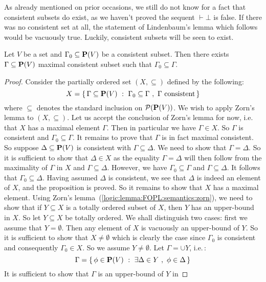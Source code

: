 As already mentioned on prior occasions, we still do not know for a
fact that consistent subsets do exist, as we haven't proved the
sequent $\vdash\bot$ is false. If there was no consistent set at
all, the statement of Lindenbaum's lemma which follows would be
vacuously true. Luckily, consistent subsets will be seen to exist.

\begin{lemma}[Lindenbaum]\label{logic:lemma:FOPL:semantics:lindenbaum}
Let $V$ be a set and $\Gamma_{0}\subseteq\mbox{${\bf P}(V)$}$ be a consistent
subset. Then there exists $\Gamma\subseteq\mbox{${\bf P}(V)$}$ maximal consistent
subset such that $\Gamma_{0}\subseteq\Gamma$.
\end{lemma}
\begin{proof}
Consider the partially ordered set $(X,\subseteq)$ defined by the
following:
    \[
    X=\{\,\Gamma\subseteq\pv\ :\ \Gamma_{0}\subseteq\Gamma\ ,\
    \mbox{$\Gamma$ consistent}\,\}
    \]
where $\subseteq$ denotes the standard inclusion on ${\cal P}(\mbox{${\bf P}(V)$})$.
We wish to apply Zorn's lemma to $(X,\subseteq)$. Let us accept the
conclusion of Zorn's lemma for now, i.e. that $X$ has a maximal
element $\Gamma$. Then in particular we have $\Gamma\in X$. So
$\Gamma$ is consistent and $\Gamma_{0}\subseteq\Gamma$. It remains
to prove that $\Gamma$ is in fact maximal consistent. So suppose
$\Delta\subseteq\mbox{${\bf P}(V)$}$ is consistent with $\Gamma\subseteq\Delta$. We
need to show that $\Gamma=\Delta$. So it is sufficient to show that
$\Delta\in X$ as the equality $\Gamma=\Delta$ will then follow from
the maximality of $\Gamma$ in $X$ and $\Gamma\subseteq\Delta$.
However, we have $\Gamma_{0}\subseteq\Gamma$ and
$\Gamma\subseteq\Delta$. It follows that
$\Gamma_{0}\subseteq\Delta$. Having assumed $\Delta$ is consistent,
we see that $\Delta$ is indeed an element of $X$, and the
proposition is proved. So it remains to show that $X$ has a maximal
element. Using Zorn's lemma~(\ref{logic:lemma:FOPL:semantics:zorn}),
we need to show that if $Y\subseteq X$ is a totally ordered subset
of $X$, then $Y$ has an upper-bound in $X$. So let $Y\subseteq X$ be
totally ordered. We shall distinguish two cases: first we assume
that $Y=\emptyset$. Then any element of $X$ is vacuously an
upper-bound of $Y$. So it is sufficient to show that
$X\neq\emptyset$ which is clearly the case since $\Gamma_{0}$ is
consistent and consequently $\Gamma_{0}\in X$. So we assume
$Y\neq\emptyset$. Let $\Gamma=\cup Y$, i.e.\,:
    \[
    \Gamma=\{\,\phi\in\pv\ :\ \exists\Delta\in Y\ ,\ \phi\in\Delta\,\}
    \]
It is sufficient to show that $\Gamma$ is an upper-bound of $Y$ in

\end{proof}
